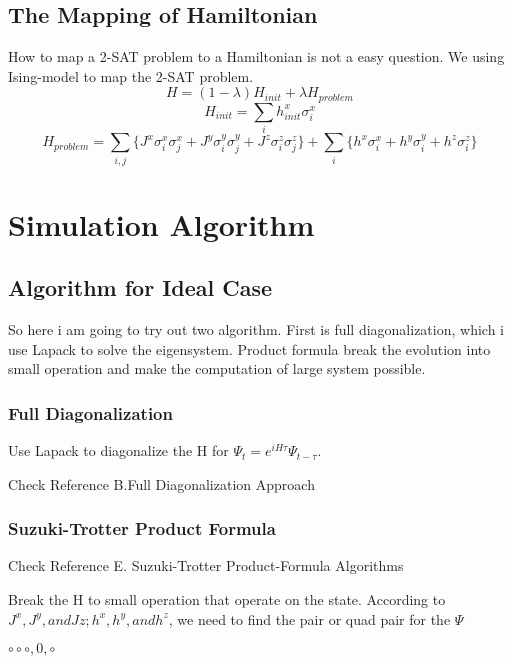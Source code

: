 \documentclass[twoside,a4paper,article]{combine}
\begin{document}
\subsection{The Mapping of Hamiltonian}

How to map a 2-SAT problem to a Hamiltonian is not a easy question. We using Ising-model to map the 2-SAT problem.
\begin{equation*}
	H=(1-\lambda)H_{init}+\lambda H_{problem}
\end{equation*}
\begin{equation*}
	H_{init}=\sum_{i} h^x_{init} \sigma^x_i
\end{equation*}
\begin{equation*}
	H_{problem}=\sum_{i,j} \{J^x \sigma^x_i \sigma^x_j+J^y \sigma^y_i \sigma^y_j+J^z \sigma^z_i \sigma^z_j \}+ \sum_{i} \{h^x \sigma^x_i+h^y \sigma^y_i+h^z \sigma^z_i\}
\end{equation*}


\section {Simulation Algorithm}
\subsection{Algorithm for Ideal Case}
So here i am going to try out two algorithm. First is full diagonalization, which i use Lapack to solve the eigensystem. Product formula break the evolution into small operation and make the computation of large system possible.
\subsubsection{Full Diagonalization}
Use Lapack to diagonalize the H for $\Psi_{t} = e^{iH\tau} \Psi_{t-\tau}$. 

Check Reference \cite{DeRaedt2004} B.Full Diagonalization Approach

\subsubsection{Suzuki-Trotter Product Formula}
Check Reference \cite{DeRaedt2004}  E. Suzuki-Trotter Product-Formula Algorithms

Break the H to small operation that operate on the state. According to $J^x , J^y, and Jz; h^x, h^y, and h^z$, we need to find the pair or quad pair for the $\Psi$

$\circ \circ \circ ,0, \circ$
\end{document}
